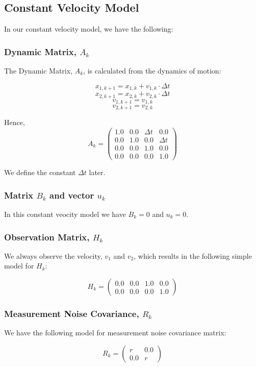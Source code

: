 \documentclass{article}
\begin{document}
\subsection{Constant Velocity Model}
In our constant velocity model, we have the following:

\subsubsection{Dynamic Matrix, $A_k$}
The Dynamic Matrix, $A_k$, is calculated from the dynamics of motion:

\[
x_{1,k+1} = x_{1,k} + v_{1,k}\cdot \Delta t
\]
\[
x_{2,k+1} = x_{2,k} + v_{2,k}\cdot \Delta t
\]
\[
v_{1,k+1} = v_{1,k}
\]
\[
v_{2,k+1} = v_{2,k}
\]

Hence, 
\[ A_k = \left( \begin{array}{cccc}
1.0 & 0.0 & \Delta t & 0.0 \\
0.0 & 1.0 & 0.0 & \Delta t \\
0.0 & 0.0 & 1.0 & 0.0 \\
0.0 & 0.0 & 0.0 & 1.0 \end{array} \right)
\] 

We define the constant $\Delta t$ later.

\subsubsection{Matrix $B_k$ and vector $u_k$}
In this constant veocity model we have $B_k = 0$ and $u_k = 0$.

\subsubsection{Observation Matrix, $H_k$}
We always observe the velocity, $v_1$ and $v_2$, which results in the following simple model for $H_k$:

\[ H_k = \left( \begin{array}{cccc}
0.0 & 0.0 & 1.0 & 0.0 \\
0.0 & 0.0 & 0.0 & 1.0 \end{array} \right)
\] 

\subsubsection{Measurement Noise Covariance, $R_k$}
We have the following model for measurement noise covariance matrix:

\[ R_k = \left( \begin{array}{cc}
r & 0.0\\
0.0 & r \end{array} \right)
\] 
\end{document}
